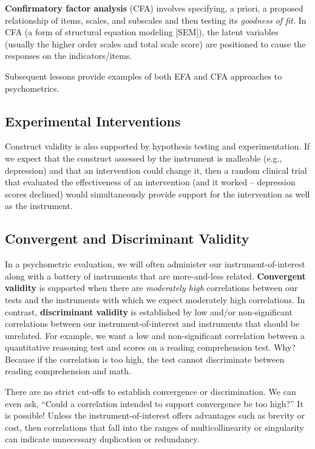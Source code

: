 \documentclass[
  english,
]{book}
\begin{document}
\textbf{Confirmatory factor analysis} (CFA) involves specifying, a priori, a proposed relationship of items, scales, and subscales and then testing its \emph{goodness of fit.} In CFA (a form of structural equation modeling {[}SEM{]}), the latent variables (usually the higher order scales and total scale score) are positioned to cause the responses on the indicators/items.

Subsequent lessons provide examples of both EFA and CFA approaches to psychometrics.

\hypertarget{experimental-interventions}{%
\subsection{Experimental Interventions}\label{experimental-interventions}}

Construct validity is also supported by hypothesis testing and experimentation. If we expect that the construct assessed by the instrument is malleable (e.g., depression) and that an intervention could change it, then a random clinical trial that evaluated the effectiveness of an intervention (and it worked -- depression scores declined) would simultaneously provide support for the intervention as well as the instrument.

\hypertarget{convergent-and-discriminant-validity}{%
\subsection{Convergent and Discriminant Validity}\label{convergent-and-discriminant-validity}}

In a psychometric evaluation, we will often administer our instrument-of-interest along with a battery of instruments that are more-and-less related. \textbf{Convergent validity} is supported when there are \emph{moderately high} correlations between our tests and the instruments with which we expect moderately high correlations. In contrast, \textbf{discriminant validity} is established by low and/or non-significant correlations between our instrument-of-interest and instruments that should be unrelated. For example, we want a low and non-significant correlation between a quantitative reasoning test and scores on a reading comprehension test. Why? Because if the correlation is too high, the test cannot discriminate between reading comprehension and math.

There are no strict cut-offs to establish convergence or discrimination. We can even ask, ``Could a correlation intended to support convergence be too high?'' It is possible! Unless the instrument-of-interest offers advantages such as brevity or cost, then correlations that fall into the ranges of multicollinearity or singularity can indicate unnecessary duplication or redundancy.
\end{document}
